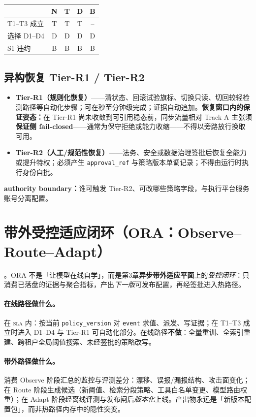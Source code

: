\documentclass[11pt,a4paper]{report}
\begin{document}
\begin{center}
\footnotesize
\begin{tabular}{@{}lcccc@{}}
\toprule
 & N & T & D & B \\
\midrule
T1--T3 成立 & T & T & T & -- \\
选择 D1--D4 & D & D & D & D \\
S1 违约 & B & B & B & B \\
\bottomrule
\end{tabular}
\end{center}

\subsection{异构恢复 Tier-R1 / Tier-R2}
\begin{itemize}
  \item \textbf{Tier-R1（规则化恢复）}——清状态、回滚试验旗标、切换只读、切回较轻检测路径等自动化步骤；可在秒至分钟级完成；证据自动追加。\textbf{恢复窗口内的保证姿态：}在 Tier-R1 尚未收敛到可引用稳态前，同步流量相对 Track A 主张须\textbf{保证侧 fail-closed}——通常为保守拒绝或能力收缩——不得以旁路放行换取可用。
  \item \textbf{Tier-R2（人工/规范性恢复）}——法务、安全或数据治理签批后恢复全能力或提升特权；必须产生 \texttt{approval\_ref} 与策略版本单调记录；不得由运行时执行身份自批。
\end{itemize}
\textbf{authority boundary：}谁可触发 Tier-R2、可改哪些策略字段，与执行平台服务账号分离配置。

\section{带外受控适应闭环（ORA：Observe--Route--Adapt）}
\ControlPlane{}。ORA 不是「让模型在线自学」，而是第3章\textbf{异步带外适应平面}上的\emph{受控闭环}：只消费已落盘的证据与聚合指标，产出\emph{下一版}可发布配置，再经签批进入热路径。

\paragraph{在线路径做什么。}在 \textsc{sla} 内：按当前 \texttt{policy\_version} 对 \texttt{event} 求值、派发、写证据；在 T1--T3 成立时进入 D1--D4 与 Tier-R1 可自动化部分。在线路径\textbf{不做}：全量重训、全索引重建、跨租户全局阈值搜索、未经签批的策略改写。

\paragraph{带外路径做什么。}消费 Observe 阶段汇总的监控与评测差分：漂移、误报/漏报结构、攻击面变化；在 Route 阶段生成候选（新阈值、检索分段策略、工具白名单变更、模型路由权重）；在 Adapt 阶段经离线评测与发布闸后\emph{版本化}上线。产出物永远是「新版本配置包」，而非热路径内存中的隐性突变。
\end{document}
